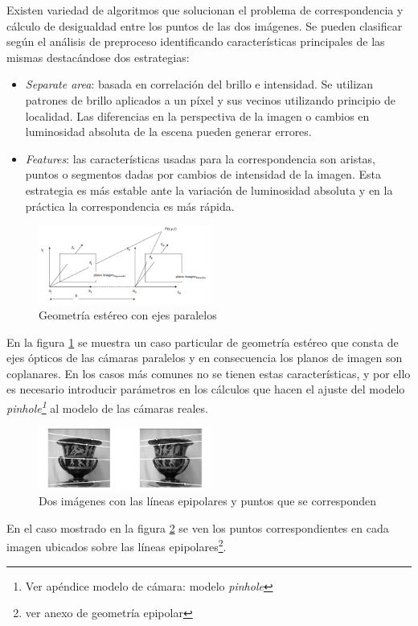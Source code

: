 Existen variedad de algoritmos que solucionan el problema de correspondencia y cálculo de desigualdad entre los puntos de las dos imágenes. Se pueden clasificar según el análisis de preproceso identificando características principales de las mismas destacándose dos estrategias\cite{StructureFromStereo}:
\begin{itemize}
   \item \emph{Separate area}: basada en correlación del brillo e intensidad. Se utilizan patrones de brillo aplicados a un píxel y sus vecinos utilizando principio de localidad. Las diferencias en la perspectiva de la imagen o cambios en luminosidad absoluta de la escena pueden generar errores.
   \item \emph{Features}: las características usadas para la correspondencia son aristas, puntos o segmentos dadas por cambios de intensidad de la imagen. Esta estrategia es más estable ante la variación de luminosidad absoluta y en la práctica la correspondencia es más rápida.
\end{itemize}

\begin{figure}[H]
  \centering
    \includegraphics[width=0.5\textwidth]{./Cap2_videomapping/stereo.PNG}
  \caption[Structure from Stereo- A Review Umesh R. Dhond and J.K.Aggarwal 1989]{Geometría estéreo con ejes paralelos}
  \label{fig:Stereo}
\end{figure}
En la figura \ref{fig:Stereo} se muestra un caso particular de geometría estéreo que consta de ejes ópticos de las cámaras paralelos y en consecuencia los planos de imagen son coplanares. En los casos más comunes no se tienen estas características, y por ello es necesario introducir parámetros en los cálculos que hacen el ajuste del modelo \emph{pinhole\footnote{Ver apéndice modelo de cámara: modelo \emph{pinhole}}} al modelo de las cámaras reales.

\begin{figure}[H]
  \centering
    \includegraphics[width=0.5\textwidth]{./Cap2_videomapping/epipolar3.PNG}
  \caption[Geometría de Cámaras StereoReview pag 241. fig 9.3]{Dos imágenes con las líneas epipolares y puntos que se corresponden}
  \label{fig:Stereo2}
\end{figure}
En el caso mostrado en la figura \ref{fig:Stereo2} se ven los puntos correspondientes en cada imagen ubicados sobre las líneas epipolares\footnote{ver anexo de geometría epipolar}.

